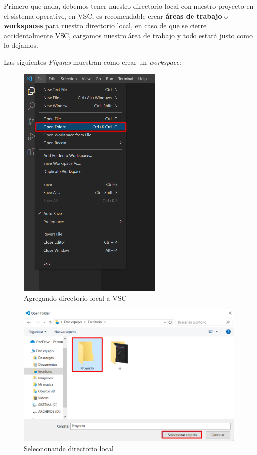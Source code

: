 Primero que nada, debemos tener nuestro directorio local con nuestro proyecto en el sistema operativo, en VSC, es recomendable crear \textbf{áreas de trabajo} o \textbf{workspaces} para nuestro directorio local, en caso de que se cierre accidentalmente VSC, cargamos nuestro área de trabajo y todo estará justo como lo dejamos.

Las siguientes \textit{Figuras} muestran como crear un \textit{workspace}:
\begin{figure}[H]
    \begin{center}
        \caption{Agregando directorio local a VSC}
        \label{fig: 4}
        \includegraphics[width=7cm]{capturas/creando_w1.png}
    \end{center}
\end{figure}
\begin{figure}[H]
    \begin{center}
        \caption{Seleccionando directorio local}
        \label{fig: 5}
        \includegraphics[width=12cm]{capturas/creando_w2.png}
    \end{center}
\end{figure}
